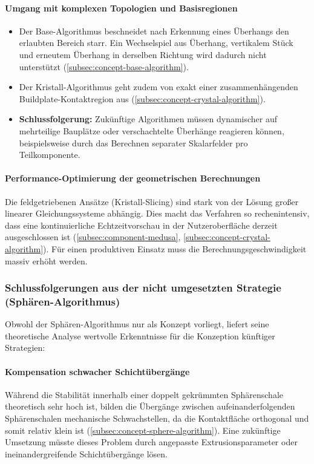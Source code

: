       \paragraph{Umgang mit komplexen Topologien und Basisregionen} 
        \begin{itemize}
        \item Der Base-Algorithmus beschneidet nach Erkennung eines Überhangs den erlaubten Bereich starr.
        Ein Wechselspiel aus Überhang, vertikalem Stück und erneutem Überhang in derselben Richtung wird dadurch nicht unterstützt (\ref{subsec:concept-base-algorithm}).
        \item Der Kristall-Algorithmus geht zudem von exakt einer zusammenhängenden Buildplate-Kontaktregion aus (\ref{subsec:concept-crystal-algorithm}).
        \item \textbf{Schlussfolgerung:} Zukünftige Algorithmen müssen dynamischer auf mehrteilige Bauplätze oder verschachtelte Überhänge reagieren können, beispielsweise durch das Berechnen separater Skalarfelder pro Teilkomponente.
        \end{itemize}

      \paragraph{Performance-Optimierung der geometrischen Berechnungen} 
        Die feldgetriebenen Ansätze (Kristall-Slicing) sind stark von der Lösung großer linearer Gleichungssysteme abhängig.
        Dies macht das Verfahren so rechenintensiv, dass eine kontinuierliche Echtzeitvorschau in der Nutzeroberfläche derzeit ausgeschlossen ist (\ref{subsec:component-medusa}, \ref{subsec:concept-crystal-algorithm}).
        Für einen produktiven Einsatz muss die Berechnungsgeschwindigkeit massiv erhöht werden.

    \subsubsection{Schlussfolgerungen aus der nicht umgesetzten Strategie (Sphären-Algorithmus)}
      Obwohl der Sphären-Algorithmus nur als Konzept vorliegt, liefert seine theoretische Analyse wertvolle Erkenntnisse für die Konzeption künftiger Strategien:
      
      \paragraph{Kompensation schwacher Schichtübergänge}
        Während die Stabilität innerhalb einer doppelt gekrümmten Sphärenschale theoretisch sehr hoch ist, bilden die Übergänge zwischen aufeinanderfolgenden Sphärenschalen mechanische Schwachstellen, da die Kontaktfläche orthogonal und somit relativ klein ist (\ref{subsec:concept-sphere-algorithm}).
        Eine zukünftige Umsetzung müsste dieses Problem durch angepasste Extrusionsparameter oder ineinandergreifende Schichtübergänge lösen.

